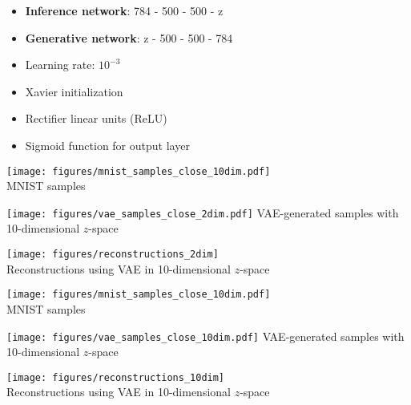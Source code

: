\documentclass[11pt, a4paper, landscape]{article}
\begin{document}
\appendix

\NewPage{}
\vfill
\begin{itemize}
  \item \textbf{Inference network}: 784 - 500 - 500 - z
  \item \textbf{Generative network}: z - 500 - 500 - 784
  \item Learning rate: $10^{-3}$
  \item Xavier initialization
  \item Rectifier linear units (ReLU)
  \item Sigmoid function for output layer
\end{itemize}
\vfill

\NewPage{}
\begin{minipage}[t]{.5\linewidth}
  \begin{center}
    \texttt{[image: figures/mnist\_samples\_close\_10dim.pdf]}\\
    MNIST samples
  \end{center}
\end{minipage}
\begin{minipage}[t]{.5\linewidth}
  \begin{center}
    \texttt{[image: figures/vae\_samples\_close\_2dim.pdf]}
    VAE-generated samples with 10-dimensional $z$-space
  \end{center}
\end{minipage}

  \begin{center}
    \texttt{[image: figures/reconstructions\_2dim]}\\
    Reconstructions using VAE in 10-dimensional $z$-space
  \end{center}

\NewPage{}
\begin{minipage}[t]{.5\linewidth}
  \begin{center}
    \texttt{[image: figures/mnist\_samples\_close\_10dim.pdf]}\\
    MNIST samples
  \end{center}
\end{minipage}
\begin{minipage}[t]{.5\linewidth}
  \begin{center}
    \texttt{[image: figures/vae\_samples\_close\_10dim.pdf]}
    VAE-generated samples with 10-dimensional $z$-space
  \end{center}
\end{minipage}

  \begin{center}
    \texttt{[image: figures/reconstructions\_10dim]}\\
    Reconstructions using VAE in 10-dimensional $z$-space
  \end{center}
\end{document}
